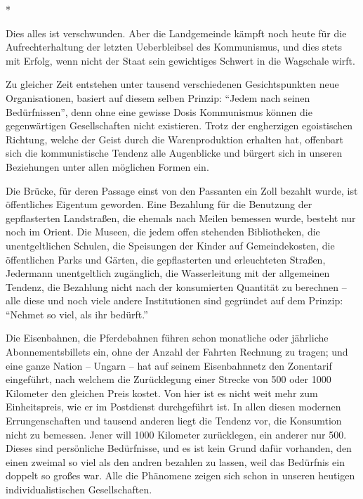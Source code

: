 \documentclass{scrbook}
\begin{document}
\begin{center}*\end{center}

Dies alles ist verschwunden. Aber die Landgemeinde kämpft noch heute für die Aufrechterhaltung der letzten Ueberbleibsel des Kommunismus, und dies stets mit Erfolg, wenn nicht der Staat sein gewichtiges Schwert in die Wagschale wirft.

Zu gleicher Zeit entstehen unter tausend verschiedenen Gesichtspunkten neue Organisationen, basiert auf diesem selben Prinzip: ``Jedem nach seinen Bedürfnissen'', denn ohne eine gewisse Dosis Kommunismus können die gegenwärtigen Gesellschaften nicht existieren. Trotz der engherzigen egoistischen Richtung, welche der Geist durch die Warenproduktion erhalten hat, offenbart sich die kommunistische Tendenz alle Augenblicke und bürgert sich in unseren Beziehungen unter allen möglichen Formen ein.

Die Brücke, für deren Passage einst von den Passanten ein Zoll bezahlt wurde, ist öffentliches Eigentum geworden. Eine Bezahlung für die Benutzung der gepflasterten Landstraßen, die ehemals nach Meilen bemessen wurde, besteht nur noch im Orient. Die Museen, die jedem offen stehenden Bibliotheken, die unentgeltlichen Schulen, die Speisungen der Kinder auf Gemeindekosten, die öffentlichen Parks und Gärten, die gepflasterten und erleuchteten Straßen, Jedermann unentgeltlich zugänglich, die Wasserleitung mit der allgemeinen Tendenz, die Bezahlung nicht nach der konsumierten Quantität zu berechnen – alle diese und noch viele andere Institutionen sind gegründet auf dem Prinzip: ``Nehmet so viel, als ihr bedürft.''

Die Eisenbahnen, die Pferdebahnen führen schon monatliche oder jährliche Abonnementsbillets ein, ohne der Anzahl der Fahrten Rechnung zu tragen; und eine ganze Nation – Ungarn – hat auf seinem Eisenbahnnetz den Zonentarif eingeführt, nach welchem die Zurücklegung einer Strecke von 500 oder 1000 Kilometer den gleichen Preis kostet. Von hier ist es nicht weit mehr zum Einheitspreis, wie er im Postdienst durchgeführt ist. In allen diesen modernen Errungenschaften und tausend anderen liegt die Tendenz vor, die Konsumtion nicht zu bemessen. Jener will 1000 Kilometer zurücklegen, ein anderer nur 500. Dieses sind persönliche Bedürfnisse, und es ist kein Grund dafür vorhanden, den einen zweimal so viel als den andren bezahlen zu lassen, weil das Bedürfnis ein doppelt so großes war. Alle die Phänomene zeigen sich schon in unseren heutigen individualistischen Gesellschaften.
\end{document}
